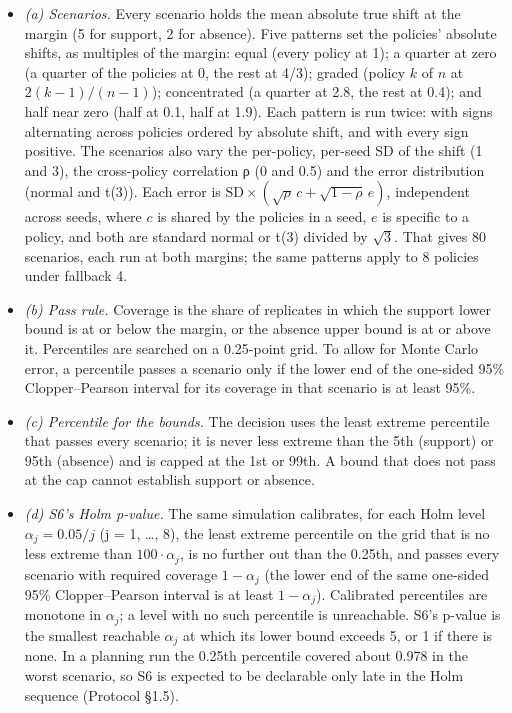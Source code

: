\documentclass[10pt,letterpaper]{article}
\providecommand{\tightlist}{\setlength{\itemsep}{0pt}\setlength{\parskip}{0pt}}
\begin{document}
\begin{enumerate}
  \begin{itemize}
  \tightlist
  \item
    \emph{(a) Scenarios.} Every scenario holds the mean
    absolute true shift at the margin (5 for support, 2 for
    absence). Five patterns set the policies' absolute
    shifts, as multiples of the margin: equal (every policy
    at 1); a quarter at zero (a quarter of the policies at
    0, the rest at 4/3); graded (policy \(k\) of \(n\) at
    \(2(k-1)/(n-1)\)); concentrated (a quarter at 2.8, the
    rest at 0.4); and half near zero (half at 0.1, half at
    1.9). Each pattern is run twice: with signs alternating
    across policies ordered by absolute shift, and with
    every sign positive. The scenarios also vary the
    per-policy, per-seed SD of the shift (1 and 3), the
    cross-policy correlation ρ (0 and 0.5) and the error
    distribution (normal and t(3)). Each error is
    \(\mathrm{SD} \times (\sqrt{\rho}\,c + \sqrt{1-\rho}\,e)\),
    independent across seeds, where \(c\) is shared by the
    policies in a seed, \(e\) is specific to a policy, and
    both are standard normal or t(3) divided by
    \(\sqrt{3}\). That gives 80 scenarios, each run at both
    margins; the same patterns apply to 8 policies under
    fallback 4.
  \item
    \emph{(b) Pass rule.} Coverage is the share of
    replicates in which the support lower bound is at or
    below the margin, or the absence upper bound is at or
    above it. Percentiles are searched on a 0.25-point grid.
    To allow for Monte Carlo error, a percentile passes a
    scenario only if the lower end of the one-sided 95\%
    Clopper--Pearson interval for its coverage in that
    scenario is at least 95\%.
  \item
    \emph{(c) Percentile for the bounds.} The decision uses
    the least extreme percentile that passes every scenario;
    it is never less extreme than the 5th (support) or 95th
    (absence) and is capped at the 1st or 99th. A bound that
    does not pass at the cap cannot establish support or
    absence.
  \item
    \emph{(d) S6's Holm p-value.} The same simulation
    calibrates, for each Holm level \(\alpha_j = 0.05/j\) (j
    = 1, \ldots, 8), the least extreme percentile on the
    grid that is no less extreme than \(100\cdot\alpha_j\),
    is no further out than the 0.25th, and passes every
    scenario with required coverage \(1 - \alpha_j\) (the
    lower end of the same one-sided 95\% Clopper--Pearson
    interval is at least \(1 - \alpha_j\)). Calibrated
    percentiles are monotone in \(\alpha_j\); a level with
    no such percentile is unreachable. S6's p-value is the
    smallest reachable \(\alpha_j\) at which its lower bound
    exceeds 5, or 1 if there is none. In a planning run the
    0.25th percentile covered about 0.978 in the worst
    scenario, so S6 is expected to be declarable only late
    in the Holm sequence (Protocol §1.5).
  \end{itemize}
\end{enumerate}
\end{document}
